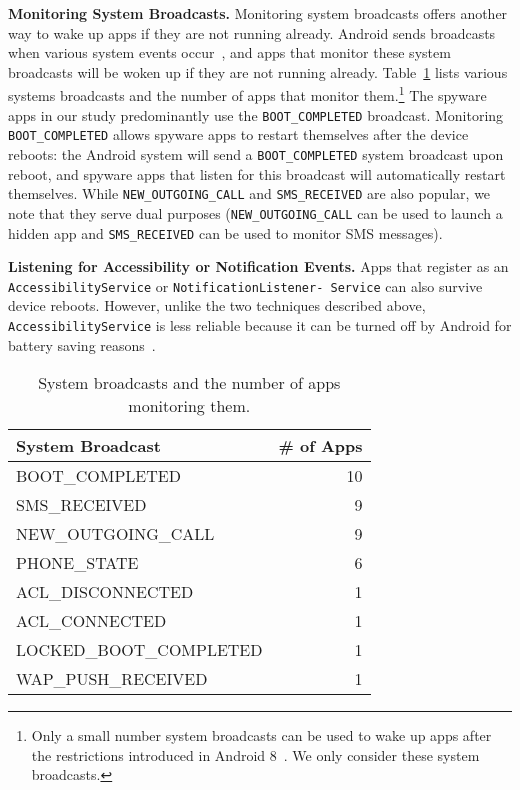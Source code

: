 \textbf{Monitoring System Broadcasts.} Monitoring system broadcasts offers another way to wake up apps if they are not running already. Android sends broadcasts when various system events occur~\cite{Broadcas25:online}, and apps that monitor these system broadcasts will be woken up if they are not running already. Table~\ref{tab:monitor_broadcast} lists various systems broadcasts and the number of apps that monitor them.\footnote{Only a small number system broadcasts can be used to wake up apps after the restrictions introduced in Android 8~\cite{Implicit72:online}. We only consider these system broadcasts.} The spyware apps in our study predominantly use the \texttt{BOOT\_COMPLETED} broadcast. Monitoring
\texttt{BOOT\_COMPLETED} allows spyware apps to restart themselves
after the device reboots: the Android system will send a
\texttt{BOOT\_COMPLETED} system broadcast upon reboot, and spyware apps that listen
for this broadcast will automatically restart themselves. While \texttt{NEW\_OUTGOING\_CALL} and \texttt{SMS\_RECEIVED} are also popular, we note that they serve dual purposes (\texttt{NEW\_OUTGOING\_CALL} can be used to launch a hidden app and \texttt{SMS\_RECEIVED} can be used to monitor SMS messages).

\textbf{Listening for Accessibility or Notification Events.} Apps that register as an
\texttt{AccessibilityService} or
\texttt{NotificationListener- Service}
can also survive device
reboots. However, unlike the two techniques described above,
\texttt{AccessibilityService}
is less reliable because it can be
turned off by Android for battery saving reasons~\cite{AndroidA0:online,Accessib46:online}.


\begin{table}[t]
  \begin{tabular}{lr}
    System Broadcast         &\# of Apps  \\
    \midrule
    BOOT\_COMPLETED          &10          \\
    SMS\_RECEIVED            &9           \\
    NEW\_OUTGOING\_CALL      &9           \\
    PHONE\_STATE             &6           \\
    ACL\_DISCONNECTED        &1           \\
    ACL\_CONNECTED           &1           \\
    LOCKED\_BOOT\_COMPLETED  &1           \\
    WAP\_PUSH\_RECEIVED      &1           \\
  \end{tabular}
  \caption{System broadcasts and the number of apps monitoring them.\label{tab:monitor_broadcast}}
\end{table}

